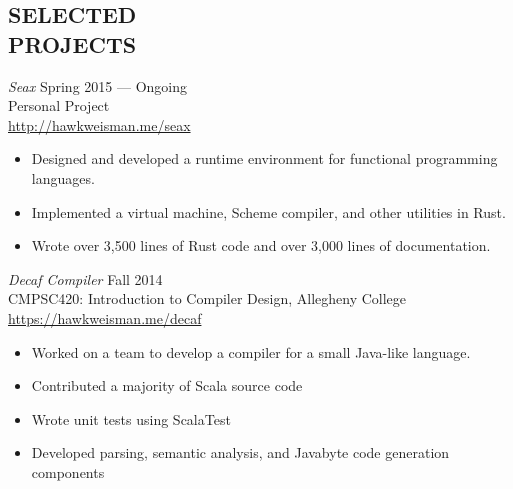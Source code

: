 \documentclass[margin]{res}
\begin{document}
\begin{resume}
\section{SELECTED \\ PROJECTS}

        {\sl Seax} \hfill Spring 2015 --- Ongoing \\
        Personal Project \\
        \url{http://hawkweisman.me/seax}
        \begin{itemize} \itemsep -2pt
            \item Designed and developed a runtime environment for functional programming languages.
            \item Implemented a virtual machine, Scheme compiler, and other utilities in Rust.
            \item Wrote over 3,500 lines of Rust code and over 3,000 lines of documentation.
        \end{itemize}

        {\sl Decaf Compiler} \hfill Fall 2014 \\
        CMPSC420: Introduction to Compiler Design, Allegheny College \\
        \url{https://hawkweisman.me/decaf}
        \begin{itemize} \itemsep -2pt %
        \item Worked on a team to develop a compiler for a small Java-like language.
        \item Contributed a majority of Scala source code
        \item Wrote unit tests using ScalaTest
        \item Developed parsing, semantic analysis, and Javabyte code generation components
        \end{itemize}


\end{resume}
\end{document}
